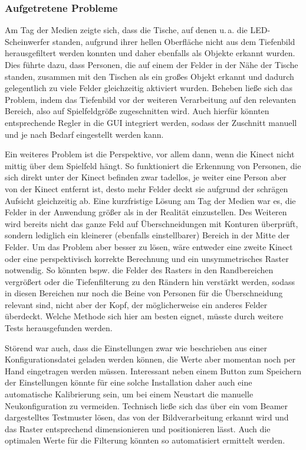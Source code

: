 \subsubsection{Aufgetretene Probleme}

Am Tag der Medien zeigte sich, dass die Tische, auf denen u.\,a. die LED-Scheinwerfer standen, aufgrund ihrer hellen Oberfläche nicht aus dem Tiefenbild herausgefiltert werden konnten und daher ebenfalls als Objekte erkannt wurden. Dies führte dazu, dass Personen, die auf einem der Felder in der Nähe der Tische standen, zusammen mit den Tischen als ein großes Objekt erkannt und dadurch gelegentlich zu viele Felder gleichzeitig aktiviert wurden. Beheben ließe sich das Problem, indem das Tiefenbild vor der weiteren Verarbeitung auf den relevanten Bereich, also auf Spielfeldgröße zugeschnitten wird. Auch hierfür könnten entsprechende Regler in die GUI integriert werden, sodass der Zuschnitt manuell und je nach Bedarf eingestellt werden kann.

Ein weiteres Problem ist die Perspektive, vor allem dann, wenn die Kinect nicht mittig über dem Spielfeld hängt. So funktioniert die Erkennung von Personen, die sich direkt unter der Kinect befinden zwar tadellos, je weiter eine Person aber von der Kinect entfernt ist, desto mehr Felder deckt sie aufgrund der schrägen Aufsicht gleichzeitig ab. Eine kurzfristige Lösung am Tag der Medien war es, die Felder in der Anwendung größer als in der Realität einzustellen. Des Weiteren wird bereits nicht das ganze Feld auf Überschneidungen mit Konturen überprüft, sondern lediglich ein kleinerer (ebenfalls einstellbarer) Bereich in der Mitte der Felder. Um das Problem aber besser zu lösen, wäre entweder eine zweite Kinect oder eine perspektivisch korrekte Berechnung und ein unsymmetrisches Raster notwendig. So könnten bspw. die Felder des Rasters in den Randbereichen vergrößert oder die Tiefenfilterung zu den Rändern hin verstärkt werden, sodass in diesen Bereichen nur noch die Beine von Personen für die Überschneidung relevant sind, nicht aber der Kopf, der möglicherweise ein anderes Felder überdeckt. Welche Methode sich hier am besten eignet, müsste durch weitere Tests herausgefunden werden.

Störend war auch, dass die Einstellungen zwar wie beschrieben aus einer Konfigurationsdatei geladen werden können, die Werte aber momentan noch per Hand eingetragen werden müssen. Interessant neben einem Button zum Speichern der Einstellungen könnte für eine solche Installation daher auch eine automatische Kalibrierung sein, um bei einem Neustart die manuelle Neukonfiguration zu vermeiden. Technisch ließe sich das über ein vom Beamer dargestelltes Testmuster lösen, das von der Bildverarbeitung erkannt wird und das Raster entsprechend dimensionieren und positionieren lässt. Auch die optimalen Werte für die Filterung könnten so automatisiert ermittelt werden.



